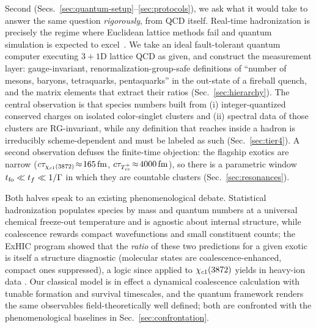 Second (Secs.~\ref{sec:quantum-setup}--\ref{sec:protocols}), we ask what it
would take to answer the same question \emph{rigorously}, from QCD itself.
Real-time hadronization is precisely the regime where Euclidean lattice
methods fail and quantum simulation is expected to
excel~\cite{Bauer:2022hpo,JordanLeePreskill:2012}.  We take an ideal
fault-tolerant quantum computer executing $3{+}1$D lattice QCD as given, and
construct the measurement layer: gauge-invariant,
renormalization-group-safe definitions of ``number of mesons, baryons,
tetraquarks, pentaquarks'' in the out-state of a fireball quench, and the
matrix elements that extract their ratios
(Sec.~\ref{sec:hierarchy}).  The central observation is that species
numbers built from (i) integer-quantized conserved charges on isolated
color-singlet clusters and (ii) spectral data of those clusters are
RG-invariant, while any definition that reaches inside a hadron is
irreducibly scheme-dependent and must be labeled as such
(Sec.~\ref{sec:tier4}).  A second observation defuses the finite-time
objection: the flagship exotics are narrow
($c\tau_{\chi_{c1}(3872)}\!\approx\!165\,\mathrm{fm}$, $c\tau_{T_{cc}^{+}}\!\approx\!4000\,\mathrm{fm}$), so
there is a parametric window $t_{\rm fo}\ll t_f \ll 1/\Gamma$ in which they
are countable clusters (Sec.~\ref{sec:resonances}).

Both halves speak to an existing phenomenological debate.  Statistical
hadronization \cite{Andronic:2017pug} populates species by mass and
quantum numbers at a universal chemical freeze-out temperature and is
agnostic about internal structure, while coalescence
\cite{Fries:2008hs} rewards compact wavefunctions and small constituent
counts; the ExHIC program \cite{ExHIC:2010gcb,ExHIC:2017smd} showed
that the \emph{ratio} of these two predictions for a given exotic is
itself a structure diagnostic (molecular states are coalescence-enhanced,
compact ones suppressed), a logic since applied to $\chi_{c1}(3872)$ yields in
heavy-ion data \cite{Zhang:2020dwn,CMS:2021znk}.  Our classical model is
in effect a dynamical coalescence calculation with tunable formation and
survival timescales, and the quantum framework renders the same
observables field-theoretically well defined; both are confronted with
the phenomenological baselines in Sec.~\ref{sec:confrontation}.
